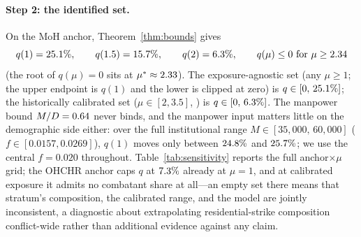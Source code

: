 \paragraph{Step 2: the identified set.} On the MoH anchor, Theorem~\ref{thm:bounds} gives
\[
q(1)=25.1{}\%,\qquad q(1.5)=15.7{}\%,\qquad q(2)=6.3{}\%,\qquad q(\mu)\le 0\ \text{for}\ \mu\ge 2.34{}
\]
(the root of $q(\mu)=0$ sits at $\mu^\ast\approx 2.33{}$). The exposure-agnostic set (any $\mu\ge 1$; the upper endpoint is $q(1)$ and the lower is clipped at zero) is $q\in[0,\,25.1{}\%]$; the historically calibrated set ($\mu\in[2,3.5]$, \citealp{frost2026}) is $q\in[0,\,6.3{}\%]$. The manpower bound $M/D=0.64{}$ never binds, and the manpower input matters little on the demographic side either: over the full institutional range $M\in[35{,}000,\,60{,}000]$ ($f\in[0.0157,0.0269]$), $q(1)$ moves only between $24.8{}\%$ and $25.7{}\%$; we use the central $f=0.020$ throughout. Table~\ref{tab:sensitivity} reports the full anchor$\times\mu$ grid; the OHCHR anchor caps $q$ at $7.3{}\%$ already at $\mu=1$, and at calibrated exposure it admits no combatant share at all---an empty set there means that stratum's composition, the calibrated range, and the model are jointly inconsistent, a diagnostic about extrapolating residential-strike composition conflict-wide rather than additional evidence against any claim.



